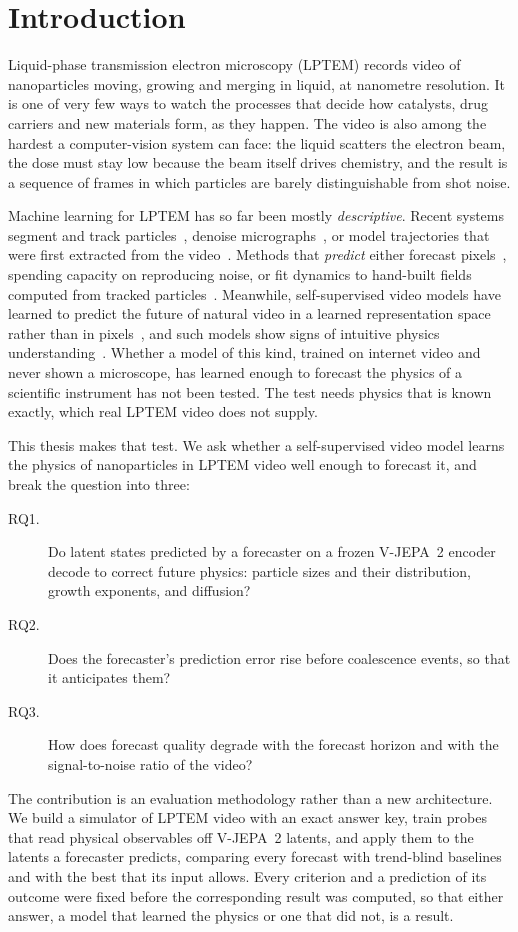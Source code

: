 \section{Introduction}
\label{sec:intro}

Liquid-phase transmission electron microscopy (LPTEM) records video of nanoparticles
moving, growing and merging in liquid, at nanometre resolution. It is one of very few
ways to watch the processes that decide how catalysts, drug carriers and new materials
form, as they happen. The video is also among the hardest a computer-vision system can
face: the liquid scatters the electron beam, the dose must stay low because the beam
itself drives chemistry, and the result is a sequence of frames in which particles are
barely distinguishable from shot noise.

Machine learning for LPTEM has so far been mostly \emph{descriptive}. Recent systems
segment and track particles~\cite{samem}, denoise micrographs~\cite{shine}, or model
trajectories that were first extracted from the video~\cite{leonardo}. Methods that
\emph{predict} either forecast pixels~\cite{fu2022insitu}, spending capacity on
reproducing noise, or fit dynamics to hand-built fields computed from tracked
particles~\cite{li2026multiscale}. Meanwhile, self-supervised video models have learned
to predict the future of natural video in a learned representation space rather than in
pixels~\cite{assran2025vjepa2}, and such models show signs of intuitive physics
understanding~\cite{garrido2025intuitive}. Whether a model of this kind, trained on
internet video and never shown a microscope, has learned enough to forecast the physics
of a scientific instrument has not been tested. The test needs physics that is known
exactly, which real LPTEM video does not supply.

This thesis makes that test. We ask whether a self-supervised video model learns the
physics of nanoparticles in LPTEM video well enough to forecast it, and break the
question into three:
\begin{description}
  \item[RQ1.] Do latent states predicted by a forecaster on a frozen V-JEPA~2 encoder
    decode to correct future physics: particle sizes and their distribution, growth
    exponents, and diffusion?
  \item[RQ2.] Does the forecaster's prediction error rise before coalescence events, so
    that it anticipates them?
  \item[RQ3.] How does forecast quality degrade with the forecast horizon and with the
    signal-to-noise ratio of the video?
\end{description}
The contribution is an evaluation methodology rather than a new architecture. We build a
simulator of LPTEM video with an exact answer key, train probes that read physical
observables off V-JEPA~2 latents, and apply them to the latents a forecaster predicts,
comparing every forecast with trend-blind baselines and with the best that its input
allows. Every criterion and a prediction of its outcome were fixed before the
corresponding result was computed, so that either answer, a model that learned the
physics or one that did not, is a result.

